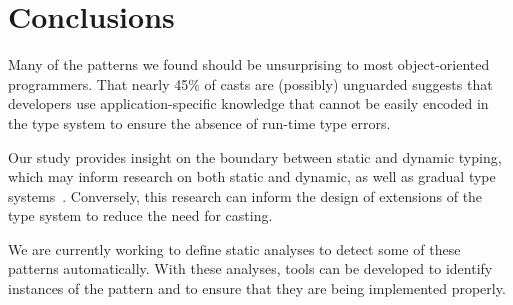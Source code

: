 \section{Conclusions}
\label{sec:casts:conclusions}

Many of the patterns we found should be unsurprising to most object-oriented programmers.
That nearly 45\% of casts are (possibly) unguarded 
suggests that developers use application-specific knowledge that cannot be easily encoded in
the type system to ensure the absence of run-time type errors.

Our study provides insight on the boundary between static and dynamic typing, which may inform
research on both static and dynamic, as well as gradual type systems~\cite{Siek06gradualtyping}.
Conversely, this research can inform the design of extensions of the \java{} type system to reduce the need for casting.

We are currently working to define static analyses to detect some of these patterns automatically.
With these analyses,
tools can be developed to identify instances of the pattern and to ensure that they are being implemented properly.